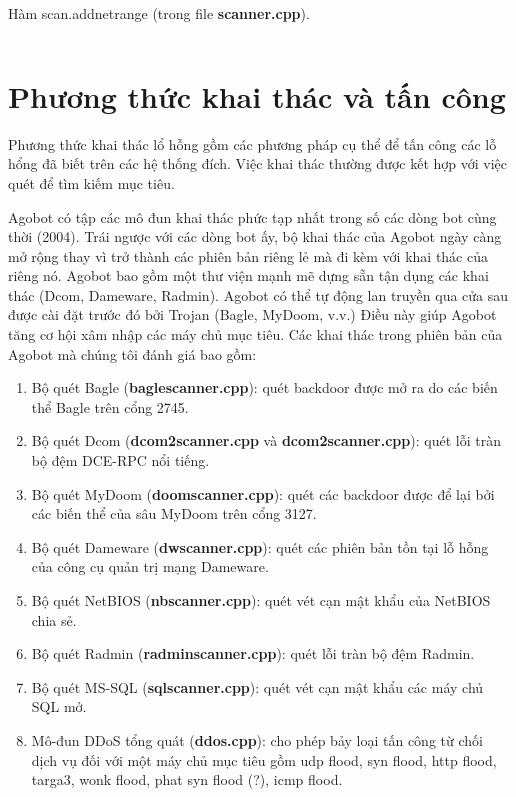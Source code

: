 \begin{listing}[ht]
	\caption{Hàm scan.addnetrange (trong file \textbf{scanner.cpp}).}\label{code:netscan}
	\inputminted{cpp}{./listings/netscan.cpp}
\end{listing}

\section{Phương thức khai thác và tấn công}
Phương thức khai thác lổ hỗng gồm các phương pháp cụ thể để tấn công các lỗ hổng đã biết trên các hệ thống đích.
Việc khai thác thường được kết hợp với việc quét để tìm kiếm mục tiêu.

Agobot có tập các mô đun khai thác phức tạp nhất trong số các dòng bot cùng thời (2004).
Trái ngược với các dòng bot ấy, bộ khai thác của Agobot ngày càng mở rộng thay vì trở thành các phiên bản riêng lẻ mà đi kèm với khai thác của riêng nó.
Agobot bao gồm một thư viện mạnh mẽ dựng sẵn tận dụng các khai thác (Dcom, Dameware, Radmin).
Agobot có thể tự động lan truyền qua cửa sau được cài đặt trước đó bởi Trojan (Bagle, MyDoom, v.v.)
Điều này giúp Agobot tăng cơ hội xâm nhập các máy chủ mục tiêu.
Các khai thác trong phiên bản của Agobot mà chúng tôi đánh giá bao gồm:

\begin{enumerate}
\item Bộ quét Bagle (\textbf{baglescanner.cpp}):
	quét backdoor được mở ra do các biến thể Bagle trên cổng 2745.
\item Bộ quét Dcom (\textbf{dcom2scanner.cpp} và \textbf{dcom2scanner.cpp}):
	quét lỗi tràn bộ đệm DCE-RPC nổi tiếng.
\item Bộ quét MyDoom (\textbf{doomscanner.cpp}):
	quét các backdoor được để lại bởi các biến thể của sâu MyDoom trên cổng 3127.
\item Bộ quét Dameware (\textbf{dwscanner.cpp}):
	quét các phiên bản tồn tại lỗ hỗng của công cụ quản trị mạng Dameware.
\item Bộ quét NetBIOS (\textbf{nbscanner.cpp}):
	quét vét cạn mật khẩu của NetBIOS chia sẻ.
\item Bộ quét Radmin (\textbf{radminscanner.cpp}):
	quét lỗi tràn bộ đệm Radmin.
\item Bộ quét MS-SQL (\textbf{sqlscanner.cpp}):
	quét vét cạn mật khẩu các máy chủ SQL mở.
\item Mô-đun DDoS tổng quát (\textbf{ddos.cpp}):
	cho phép bảy loại tấn công từ chối dịch vụ đối với một máy chủ mục tiêu gồm
	udp flood,
	syn flood,
	http flood,
	targa3,
	wonk flood,
	phat syn flood (?),
	icmp flood.
\end{enumerate}

